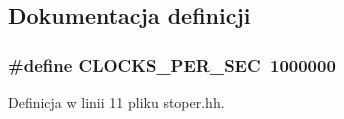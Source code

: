 \subsection{\-Dokumentacja definicji}
\hypertarget{stoper_8hh_a3d9fc3c745d0880902fe3ea3d5d5f71e}{
\subsubsection[{\-C\-L\-O\-C\-K\-S\-\_\-\-P\-E\-R\-\_\-\-S\-E\-C}]{\setlength{\rightskip}{0pt plus 5cm}\#define {\bf \-C\-L\-O\-C\-K\-S\-\_\-\-P\-E\-R\-\_\-\-S\-E\-C}~1000000}}\label{stoper_8hh_a3d9fc3c745d0880902fe3ea3d5d5f71e}


\-Definicja w linii 11 pliku stoper.\-hh.

